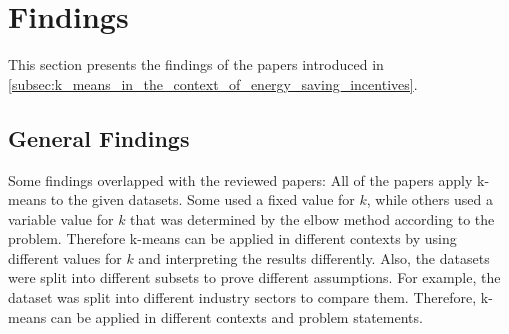 \chapter{Findings}
\label{cha:findings}


This section presents the findings of the papers introduced in \autoref{subsec:k_means_in_the_context_of_energy_saving_incentives}.

\section{General Findings}
Some findings overlapped with the reviewed papers:
All of the papers apply k-means to the given datasets.
Some used a fixed value for $k$, while others used a variable value for $k$ that was determined by the elbow method according to the problem.
Therefore k-means can be applied in different contexts by using different values for $k$ and interpreting the results differently.
Also, the datasets were split into different subsets to prove different assumptions.
For example, the dataset was split into different industry sectors to compare them.
Therefore, k-means can be applied in different contexts and problem statements.


